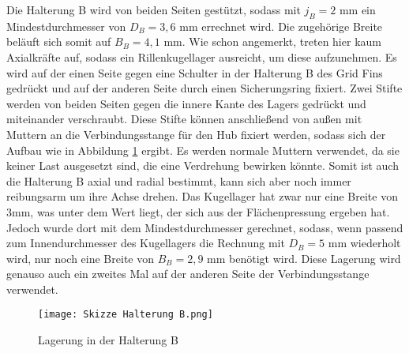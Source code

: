 Die Halterung B wird von beiden Seiten gestützt, sodass mit $j_B = 2$ mm ein Mindestdurchmesser von $D_B = 3,6$ mm errechnet wird. Die zugehörige Breite beläuft sich somit auf $B_B = 4,1$ mm. Wie schon angemerkt, treten hier kaum Axialkräfte auf, sodass ein Rillenkugellager ausreicht, um diese aufzunehmen. Es wird auf der einen Seite gegen eine Schulter in der Halterung B des Grid Fins gedrückt und auf der anderen Seite durch einen Sicherungsring fixiert. Zwei Stifte werden von beiden Seiten gegen die innere Kante des Lagers gedrückt und miteinander verschraubt. Diese Stifte können anschließend von außen mit Muttern an die Verbindungsstange für den Hub fixiert werden, sodass sich der Aufbau wie in Abbildung \ref{abb_Lager_HB} ergibt. Es werden normale Muttern verwendet, da sie keiner Last ausgesetzt sind, die eine Verdrehung bewirken könnte. Somit ist auch die Halterung B axial und radial bestimmt, kann sich aber noch immer reibungsarm um ihre Achse drehen. Das Kugellager hat zwar nur eine Breite von 3mm, was unter dem Wert liegt, der sich aus der Flächenpressung ergeben hat. Jedoch wurde dort mit dem Mindestdurchmesser gerechnet, sodass, wenn passend zum Innendurchmesser des Kugellagers die Rechnung mit $D_B = 5$ mm wiederholt wird, nur noch eine Breite von $B_B =2,9$ mm benötigt wird. Diese Lagerung wird genauso auch ein zweites Mal auf der anderen Seite der Verbindungsstange verwendet.
\begin{figure}[h] 
	\centering
	\texttt{[image: Skizze Halterung B.png]}
	\caption{Lagerung in der Halterung B}
	\label{abb_Lager_HB}
\end{figure}
